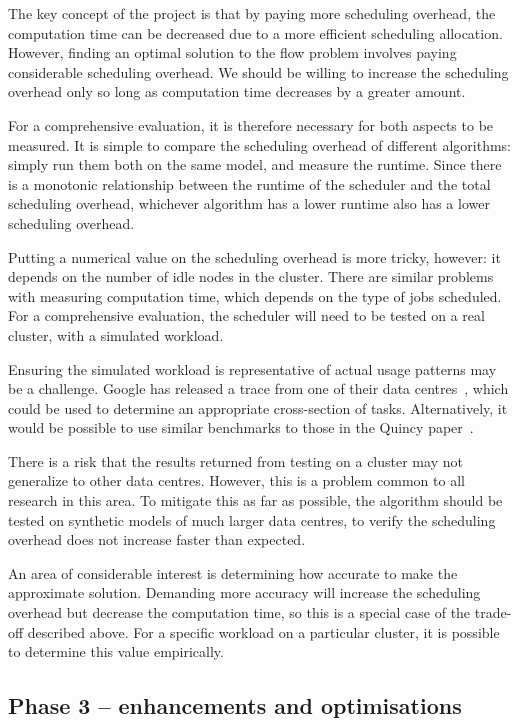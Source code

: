 The key concept of the project is that by paying more scheduling overhead, the computation time can be decreased due to a more efficient scheduling allocation. However, finding an optimal solution to the flow problem involves paying considerable scheduling overhead. We should be willing to increase the scheduling overhead only so long as computation time decreases by a greater amount.

For a comprehensive evaluation, it is therefore necessary for both aspects to be measured. It is simple to compare the scheduling overhead of different algorithms: simply run them both on the same model, and measure the runtime. Since there is a monotonic relationship between the runtime of the scheduler and the total scheduling overhead, whichever algorithm has a lower runtime also has a lower scheduling overhead.

Putting a numerical value on the scheduling overhead is more tricky, however: it depends on the number of idle nodes in the cluster. There are similar problems with measuring computation time, which depends on the type of jobs scheduled. For a comprehensive evaluation, the scheduler will need to be tested on a real cluster, with a simulated workload. 

Ensuring the simulated workload is representative of actual usage patterns may be a challenge. Google has released a trace from one of their data centres~\cite{clusterdata:Wilkes2011,clusterdata:Reiss2011}, which could be used to determine an appropriate cross-section of tasks. Alternatively, it would be possible to use similar benchmarks to those in the Quincy paper~\cite{Isard:2009}.

There is a risk that the results returned from testing on a cluster may not generalize to other data centres. However, this is a problem common to all research in this area. To mitigate this as far as possible, the algorithm should be tested on synthetic models of much larger data centres, to verify the scheduling overhead does not increase faster than expected.

An area of considerable interest is determining how accurate to make the approximate solution. Demanding more accuracy will increase the scheduling overhead but decrease the computation time, so this is a special case of the trade-off described above. For a specific workload on a particular cluster, it is possible to determine this value empirically.

\subsection*{Phase 3 -- enhancements and optimisations}

